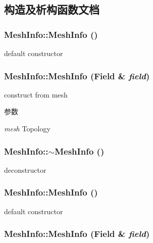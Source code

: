 \subsection{构造及析构函数文档}
\hypertarget{classMeshInfo_aef70a30d8c1810d076466ad91b3d6e53}{
\subsubsection[{MeshInfo}]{\setlength{\rightskip}{0pt plus 5cm}MeshInfo::MeshInfo ()}}
\label{classMeshInfo_aef70a30d8c1810d076466ad91b3d6e53}


default constructor \hypertarget{classMeshInfo_a3c1bd0006d1c4173df6b14b60d5a0cd0}{
\subsubsection[{MeshInfo}]{\setlength{\rightskip}{0pt plus 5cm}MeshInfo::MeshInfo (Field \& {\em field})}}
\label{classMeshInfo_a3c1bd0006d1c4173df6b14b60d5a0cd0}


construct from mesh 
\begin{DoxyParams}{参数}
\item[{\em mesh}]Topology \end{DoxyParams}
\hypertarget{classMeshInfo_a0c6b7e15ff450757e92402f80e93ede6}{
\subsubsection[{$\sim$MeshInfo}]{\setlength{\rightskip}{0pt plus 5cm}MeshInfo::$\sim$MeshInfo ()}}
\label{classMeshInfo_a0c6b7e15ff450757e92402f80e93ede6}


deconstructor \hypertarget{classMeshInfo_aef70a30d8c1810d076466ad91b3d6e53}{
\subsubsection[{MeshInfo}]{\setlength{\rightskip}{0pt plus 5cm}MeshInfo::MeshInfo ()}}
\label{classMeshInfo_aef70a30d8c1810d076466ad91b3d6e53}


default constructor \hypertarget{classMeshInfo_a3c1bd0006d1c4173df6b14b60d5a0cd0}{
\subsubsection[{MeshInfo}]{\setlength{\rightskip}{0pt plus 5cm}MeshInfo::MeshInfo (Field \& {\em field})}}
\label{classMeshInfo_a3c1bd0006d1c4173df6b14b60d5a0cd0}


